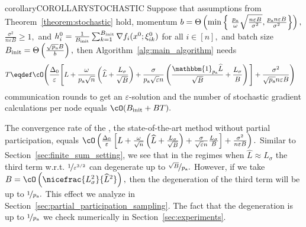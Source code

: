 \documentclass{article}
\newcommand{\algorithmname}{DASHA-PP}
\newcommand*{\probavailable}{\ensuremath{p_{\textnormal{a}}}}
\begin{document}
\begin{restatable}{corollary}{COROLLARYSTOCHASTIC}
  \label{cor:stochastic}
  Suppose that assumptions from Theorem~\ref{theorem:stochastic} hold, momentum $b = \Theta\left(\min \left\{\ \frac{\probavailable}{\omega}\sqrt{\frac{n \varepsilon B}{\sigma^2}}, \frac{\probavailable n \varepsilon B}{\sigma^2}\right\}\right),$ $\frac{\sigma^2}{n \varepsilon B} \geq 1,$
  and $h^{0}_i = \frac{1}{B_{\textnormal{init}}} \sum_{k = 1}^{B_{\textnormal{init}}} \nabla f_i(x^0; \xi^0_{ik})$ for all $i \in [n],$ and batch size $B_{\textnormal{init}} = \Theta\left(\frac{\sqrt{\probavailable} B}{b}\right),$ then Algorithm~\ref{alg:main_algorithm} \algname{(\algorithmname-MVR)} needs
  {\scriptsize\begin{align*}&T \eqdef \cO\Bigg(\frac{\Delta_0}{\varepsilon}\Bigg[L + \frac{\omega}{\probavailable\sqrt{n}}\left(\widehat{L} + \frac{L_{\sigma}}{\sqrt{B}}\right) + \frac{\sigma}{\probavailable \sqrt{\varepsilon} n}\left(\frac{\mathbbm{1}_{\probavailable}\widehat{L}}{\sqrt{B}} + \frac{L_\sigma}{B}\right)\Bigg] + \frac{\sigma^2}{\sqrt{\probavailable} n \varepsilon B}\Bigg)\end{align*}}
  communication rounds to get an $\varepsilon$-solution and the number of stochastic gradient calculations per node equals $\cO(B_{\textnormal{init}} + BT).$
\end{restatable}

The convergence rate of the , the state-of-the-art method without partial participation, equals $\cO\left(\frac{\Delta_0}{\varepsilon}\left[L + \frac{\omega}{\sqrt{n}}\left(\widehat{L} + \frac{L_{\sigma}}{\sqrt{B}}\right) + \frac{\sigma}{\sqrt{\varepsilon} n}\frac{L_\sigma}{B}\right] + \frac{\sigma^2}{n \varepsilon B}\right).$ Similar to Section~\ref{sec:finite_sum_setting}, we see that in the regimes when $\widehat{L} \approx L_{\sigma}$ the third term w.r.t. $\nicefrac{1}{\varepsilon^{3/2}}$ can degenerate up to $\nicefrac{\sqrt{B}}{\probavailable}.$ However, if we take $B = \cO\left(\nicefrac{L_{\sigma}^2}{\widehat{L}^2}\right),$ then the degeneration of the third term will be up to $\nicefrac{1}{\probavailable}.$ This effect we analyze in Section~\ref{sec:partial_participation_sampling}. The fact that the degeneration is up to $\nicefrac{1}{\probavailable}$ we check numerically in Section~\ref{sec:experiments}.
\end{document}
